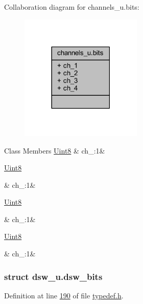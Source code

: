 Collaboration diagram for channels\+\_\+u.\+bits\+:
\nopagebreak
\begin{figure}[H]
\begin{center}
\leavevmode
\includegraphics[width=165pt]{d0/def/a00256}
\end{center}
\end{figure}
\begin{DoxyFields}{Class Members}
\hypertarget{a00001_a0ea376d80e7a02e62667b38515cbb2fe}{\hyperlink{a00001_a979e3e23b9a449e69ab6a8a83b6042f8}{Uint8}}\label{a00001_a0ea376d80e7a02e62667b38515cbb2fe}
&
ch\+\_\+:1&
\\
\hline

\hypertarget{a00001_a7f0c979efb16649f6d5082b824737efc}{\hyperlink{a00001_a979e3e23b9a449e69ab6a8a83b6042f8}{Uint8}}\label{a00001_a7f0c979efb16649f6d5082b824737efc}
&
ch\+\_\+:1&
\\
\hline

\hypertarget{a00001_a783b64e129c4e59c9406250eba4ea43f}{\hyperlink{a00001_a979e3e23b9a449e69ab6a8a83b6042f8}{Uint8}}\label{a00001_a783b64e129c4e59c9406250eba4ea43f}
&
ch\+\_\+:1&
\\
\hline

\hypertarget{a00001_a9b4aa7325380101eeaec6de8039335ce}{\hyperlink{a00001_a979e3e23b9a449e69ab6a8a83b6042f8}{Uint8}}\label{a00001_a9b4aa7325380101eeaec6de8039335ce}
&
ch\+\_\+:1&
\\
\hline

\end{DoxyFields}
\label{d9/db3/a00066}
\hypertarget{a00001_d9/db3/a00066}{}
\subsubsection{struct dsw\+\_\+u.\+dsw\+\_\+bits}


Definition at line \hyperlink{a00001_source_l00190}{190} of file \hyperlink{a00001_source}{typedef.\+h}.



